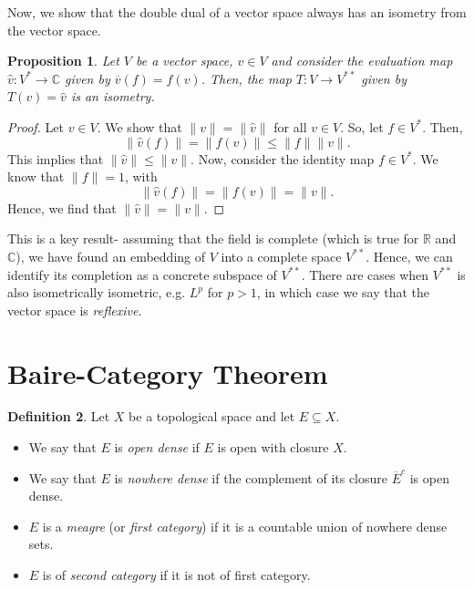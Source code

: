\documentclass[a4paper, openany]{memoir}
\theoremstyle{definition}
\newtheorem{definition}{Definition}[section]
\theoremstyle{plain}
\newtheorem{proposition}[definition]{Proposition}
\begin{document}
    Now, we show that the double dual of a vector space always has an isometry from the vector space.
    \begin{proposition}
        Let $V$ be a vector space, $v \in V$ and consider the evaluation map $\hat{v} \colon V^* \to \mathbb{C}$ given by $\overline{v}(f) = f(v)$. Then, the map $T \colon V \to V^{**}$ given by $T(v) = \hat{v}$ is an isometry.
    \end{proposition}
    \begin{proof}
        Let $v \in V$. We show that $\lVert v \rVert = \lVert \hat{v} \rVert$ for all $v \in V$. So, let $f \in V^*$. Then,
        \[\lVert \hat{v}(f) \rVert = \lVert f(v) \rVert \leq \lVert f \rVert \lVert v \rVert.\]
        This implies that $\lVert \hat{v} \rVert \leq \lVert v \rVert$. Now, consider the identity map $f \in V^*$. We know that $\lVert f \rVert = 1$, with 
        \[\lVert \hat{v}(f) \rVert = \lVert f(v) \rVert = \lVert v \rVert.\]
        Hence, we find that $\lVert \hat{v} \rVert = \lVert v \rVert$.
    \end{proof}
    \noindent This is a key result- assuming that the field is complete (which is true for $\mathbb{R}$ and $\mathbb{C}$), we have found an embedding of $V$ into a complete space $V^{**}$. Hence, we can identify its completion as a concrete subspace of $V^{**}$. There are cases when $V^{**}$ is also isometrically isometric, e.g. $L^p$ for $p > 1$, in which case we say that the vector space is \emph{reflexive}.


    \newpage

    \section{Baire-Category Theorem}
    \begin{definition}
        Let $X$ be a topological space and let $E \subseteq X$.
        \begin{itemize}
            \item We say that $E$ is \emph{open dense} if $E$ is open with closure $X$.
            \item We say that $E$ is \emph{nowhere dense} if the complement of its closure $\overline{E}^c$ is open dense.
            \item $E$ is a \emph{meagre} (or \emph{first category}) if it is a countable union of nowhere dense sets.
            \item $E$ is of \emph{second category} if it is not of first category.
        \end{itemize}
    \end{definition}
    
\end{document}
